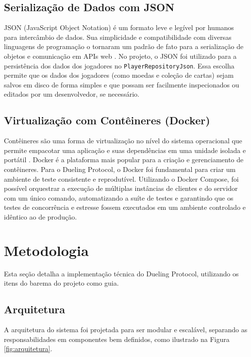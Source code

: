 \documentclass[12pt,a4paper]{article}
\begin{document}
\subsection{Serialização de Dados com JSON}
JSON (JavaScript Object Notation) é um formato leve e legível por humanos para intercâmbio de dados. Sua simplicidade e compatibilidade com diversas linguagens de programação o tornaram um padrão de fato para a serialização de objetos e comunicação em APIs web \cite{json}. No projeto, o JSON foi utilizado para a persistência dos dados dos jogadores no \texttt{PlayerRepositoryJson}. Essa escolha permite que os dados dos jogadores (como moedas e coleção de cartas) sejam salvos em disco de forma simples e que possam ser facilmente inspecionados ou editados por um desenvolvedor, se necessário.

\subsection{Virtualização com Contêineres (Docker)}
Contêineres são uma forma de virtualização no nível do sistema operacional que permite empacotar uma aplicação e suas dependências em uma unidade isolada e portátil \cite{docker}. Docker é a plataforma mais popular para a criação e gerenciamento de contêineres. Para o Dueling Protocol, o Docker foi fundamental para criar um ambiente de teste consistente e reprodutível. Utilizando o Docker Compose, foi possível orquestrar a execução de múltiplas instâncias de clientes e do servidor com um único comando, automatizando a suíte de testes e garantindo que os testes de concorrência e estresse fossem executados em um ambiente controlado e idêntico ao de produção.

\section{Metodologia}

Esta seção detalha a implementação técnica do Dueling Protocol, utilizando os itens do barema do projeto como guia.

\subsection{Arquitetura}
A arquitetura do sistema foi projetada para ser modular e escalável, separando as responsabilidades em componentes bem definidos, como ilustrado na Figura \ref{fig:arquitetura}.
\end{document}
